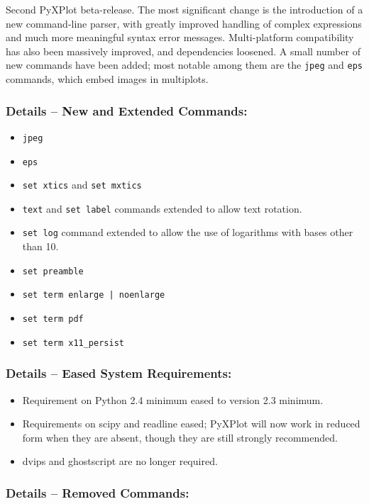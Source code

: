 \documentclass[a4paper,onecolumn,11pt]{book}
\begin{document}
Second PyXPlot beta-release. The most significant change is the introduction of
a new command-line parser, with greatly improved handling of complex
expressions and much more meaningful syntax error messages. Multi-platform
compatibility has also been massively improved, and dependencies loosened.  A
small number of new commands have been added; most notable among them are the
{\tt jpeg} and {\tt eps} commands, which embed images in multiplots.

\subsubsection*{Details -- New and Extended Commands:}

\begin{itemize}
\item {\tt jpeg}
\item {\tt eps}
\item {\tt set xtics} and {\tt set mxtics}
\item {\tt text} and {\tt set label} commands extended to allow text rotation.
\item {\tt set log} command extended to allow the use of logarithms with bases other than 10.
\item {\tt set preamble}
\item {\tt set term enlarge | noenlarge}
\item {\tt set term pdf}
\item {\tt set term x11\_persist}
\end{itemize}

\subsubsection*{Details -- Eased System Requirements:}

\begin{itemize}
\item Requirement on Python 2.4 minimum eased to version 2.3 minimum.
\item Requirements on scipy and readline eased; PyXPlot will now work in reduced form when they are absent, though they are still strongly recommended.
\item dvips and ghostscript are no longer required.
\end{itemize}

\subsubsection*{Details -- Removed Commands:}
\end{document}
